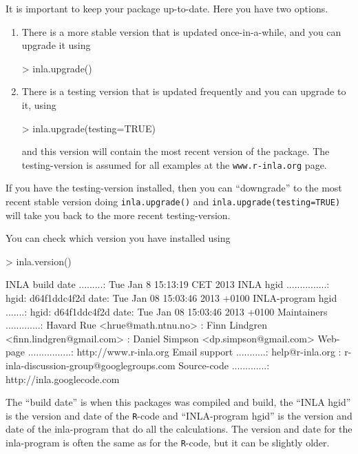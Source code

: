 \documentclass[a4paper,11pt]{report}
\newcommand{\tv}{\texttt}
\begin{document}
It is important to keep your package up-to-date. Here you have two
options. 
\begin{enumerate}
\item There is a more stable version that is updated once-in-a-while,
    and you can upgrade it using
\begin{Schunk}
\begin{Sinput}
> inla.upgrade()
\end{Sinput}
\end{Schunk}
\item There is a testing version that is updated frequently and you
    can upgrade to it, using
\begin{Schunk}
\begin{Sinput}
> inla.upgrade(testing=TRUE)
\end{Sinput}
\end{Schunk}
and this version will contain the most recent version of the package.
The testing-version is assumed for all examples at the
\verb|www.r-inla.org| page. 
\end{enumerate}
If you have the testing-version installed, then you can ``downgrade''
to the most recent stable version doing \verb|inla.upgrade()| and
\verb|inla.upgrade(testing=TRUE)| will take you back to the more
recent testing-version. 

You can check which version you have installed using
\begin{Schunk}
\begin{Sinput}
> inla.version()
\end{Sinput}
\begin{Soutput}
	INLA build date .........: Tue Jan  8 15:13:19 CET 2013
	INLA hgid ...............: hgid: d64f1ddc4f2d  date: Tue Jan 08 15:03:46 2013 +0100
	INLA-program hgid .......: hgid: d64f1ddc4f2d  date: Tue Jan 08 15:03:46 2013 +0100
	Maintainers .............: Havard Rue <hrue@math.ntnu.no>
	                         : Finn Lindgren <finn.lindgren@gmail.com>
	                         : Daniel Simpson <dp.simpson@gmail.com>
	Web-page ................: http://www.r-inla.org
	Email support ...........: help@r-inla.org
	                         : r-inla-discussion-group@googlegroups.com
	Source-code .............: http://inla.googlecode.com
\end{Soutput}
\end{Schunk}
The ``build date'' is when this packages was compiled and build, the
``INLA hgid'' is the version and date of the \tv{R}-code and 
``INLA-program hgid'' is the version and date of the inla-program that
do all the calculations. The version and date for the inla-program is
often the same as for the \tv{R}-code, but it can be slightly older. 
\end{document}
